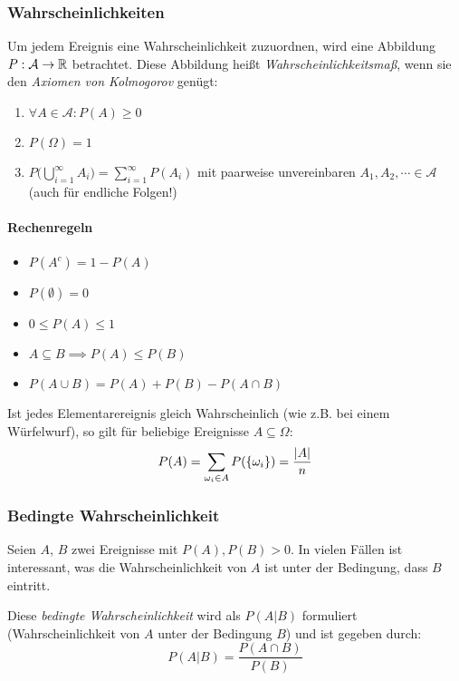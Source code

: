 		\subsubsection{Wahrscheinlichkeiten}
			Um jedem Ereignis eine Wahrscheinlichkeit zuzuordnen, wird eine Abbildung \( P : \mathcal{A} \rightarrow \mathbb{R} \) betrachtet. Diese Abbildung heißt \textit{Wahrscheinlichkeitsmaß}, wenn sie den \textit{Axiomen von Kolmogorov} genügt:
			\begin{enumerate}
				\item \( \forall A \in \mathcal{A} : P(A) \geq 0 \)
				\item \( P(\Omega) = 1 \)
				\item \( P\Big( \bigcup_{i = 1}^\infty A_i \Big) = \sum_{i = 1}^{\infty} P(A_i) \) mit paarweise unvereinbaren \( A_1, A_2, \cdots \in \mathcal{A} \) (auch für endliche Folgen!)
			\end{enumerate}

			\paragraph{Rechenregeln}
				\begin{itemize}
					\item \( P(A^c) = 1 - P(A) \)
					\item \( P(\emptyset) = 0 \)
					\item \( 0 \leq P(A) \leq 1 \)
					\item \( A \subseteq B \implies P(A) \leq P(B) \)
					\item \( P(A \cup B) = P(A) + P(B) - P(A \cap B) \)
				\end{itemize}

				Ist jedes Elementarereignis gleich Wahrscheinlich (wie z.B. bei einem Würfelwurf), so gilt für beliebige Ereignisse \( A \subseteq \Omega \):
				\begin{equation*}
					P(A) = \sum_{\omega_i \in A} P(\{ \omega_i \}) = \frac{\abs{A}}{n}
				\end{equation*}

			\subsubsection{Bedingte Wahrscheinlichkeit}
				Seien \(A\), \(B\) zwei Ereignisse mit \( P(A), P(B) > 0 \). In vielen Fällen ist interessant, was die Wahrscheinlichkeit von \(A\) ist unter der Bedingung, dass \(B\) eintritt.

				Diese \textit{bedingte Wahrscheinlichkeit} wird als \( P(A \vert B) \) formuliert (Wahrscheinlichkeit von \(A\) unter der Bedingung \(B\)) und ist gegeben durch:
				\begin{equation*}
					P(A \vert B) = \frac{P(A \cap B)}{P(B)}
				\end{equation*}

